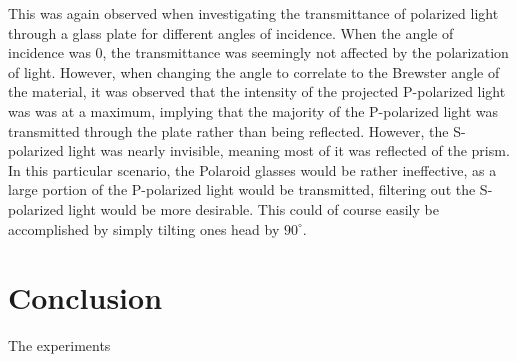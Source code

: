 \documentclass[%
 reprint,
 amsmath,amssymb,
 aps,
]{revtex4-1}
\begin{document}
    This was again observed when investigating the transmittance of polarized light through a glass plate for different angles of incidence. When the angle of incidence was 0, the transmittance was seemingly not affected by the polarization of light. However, when changing the angle to correlate to the Brewster angle of the material, it was observed that the intensity of the projected P-polarized light was was at a maximum, implying that the majority of the P-polarized light was transmitted through the plate rather than being reflected. However, the S-polarized light was nearly invisible, meaning most of it was reflected of the prism. In this particular scenario, the Polaroid glasses would be rather ineffective, as a large portion of the P-polarized light would be transmitted, filtering out the S-polarized light would be more desirable. This could of course easily be accomplished by simply tilting ones head by $90^\circ$.


\section{\label{sect:conclusion}Conclusion}
  The experiments 

\newpage


\end{document}
